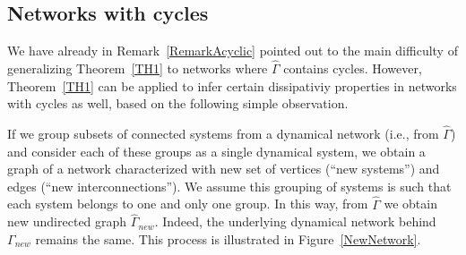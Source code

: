 \documentclass[11pt,a4paper,oneside,DIV=12,headings=small]{scrartcl}
\theoremstyle{plain}
\begin{document}

\subsection{Networks with cycles}
We have already in Remark~\ref{RemarkAcyclic} pointed out to the main difficulty of generalizing Theorem~\ref{TH1} to networks where $\hat{\Gamma}$ contains cycles. However, Theorem~\ref{TH1} can be applied to infer certain dissipativiy properties in networks with cycles as well, based on the following simple observation. 

If we group subsets of connected systems from a dynamical network (i.e., from $\hat{\Gamma}$) and consider each of these groups as a single dynamical system, we obtain a graph of a network characterized with new set of vertices (``new systems'') and edges (``new interconnections''). We assume this grouping of systems is such that each system belongs to one and only one group. In this way, from $\hat{\Gamma}$ we obtain new undirected graph $\hat{\Gamma}_{new}$. Indeed, the underlying dynamical network behind  $\Gamma_{new}$ remains the same. This process is illustrated in Figure~\ref{NewNetwork}.  

\end{document}
